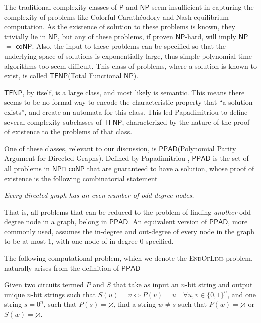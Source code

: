 \documentclass[a4paper,11pt]{article}
\def\cc#1{\mathsf{#1}}
\def\PPAD{\ensuremath{\cc{PPAD}}\xspace}
\def\P{\ensuremath{\cc{P}}\xspace}
\def\NP{\ensuremath{\cc{NP}}\xspace}
\def\TFNP{\ensuremath{\cc{TFNP}}\xspace}
\def\coNP{\ensuremath{\cc{coNP}}\xspace}
\def\problem#1{\textsc{#1}}
\def\EOL{\problem{EndOfLine}\xspace}
\def\CC{Colorful Carath\'eodory }
\begin{document}
\par The traditional complexity classes of \P and \NP seem insufficient in capturing the complexity of problems like \CC and Nash equilibrium computation. As the existence of solution to these problems is known, they trivially lie in \NP, but any of these problems, if proven \NP-hard, will imply \NP $=$ \coNP \cite{CP}. Also, the input to these problems can be specified so that the underlying space of solutions is exponentially large, thus simple polynomial time algorithms too seem difficult. This class of problems, where a solution is known to exist, is called \TFNP (Total Functional \NP). 

\par \TFNP, by itself, is a large class, and most likely is semantic. This means there seems to be no formal way to encode the characteristic property that ``a solution exists'', and create an automata for this class. This led Papadimitriou to define several complexity subclasses of \TFNP, characterized by the nature of the proof of existence to the problems of that class. 

\par One of these classes, relevant to our discussion, is \PPAD (Polynomial Parity Argument for Directed Graphs). Defined by Papadimitriou \cite{CP}, \PPAD is the set of all problems in \NP $\cap$ \coNP that are guaranteed to have a solution, whose proof of existence is the following combinatorial statement

\begin{center}
\textit{Every directed graph has an even number of odd degree nodes.}
\end{center}

\par That is, all problems that can be reduced to the problem of finding \textit{another} odd degree node in a graph, belong in \PPAD. An equivalent version of \PPAD, more commonly used, assumes the in-degree and out-degree of every node in the graph to be at most $1$, with one node of in-degree $0$ specified.  

\par The following computational problem, which we denote the \EOL problem, naturally arises from the definition of \PPAD

\begin{definition}[\EOL Problem]
Given two circuits termed $P$ and $S$ that take as input an $n$-bit string and output unique $n$-bit strings such that $S(u) = v \Leftrightarrow P(v) = u \quad \forall u,v \in \{ 0, 1 \}^n$, and one string $s = 0^n$, such that $P(s) = \varnothing$, find a string $w \neq s$ such that $P(w) = \varnothing$ or $S(w) = \varnothing$.  
\end{definition}
\end{document}
